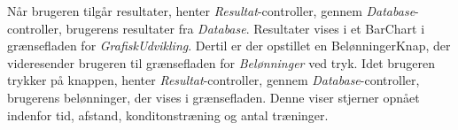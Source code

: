 \noindent 
Når brugeren tilgår resultater, henter \textit{Resultat}-controller, gennem \textit{Database}-controller, brugerens resultater fra \textit{Database}. Resultater vises i et BarChart i grænsefladen for \textit{GrafiskUdvikling}. Dertil er der opstillet en BelønningerKnap, der videresender brugeren til grænsefladen for \textit{Belønninger} ved tryk. Idet brugeren trykker på knappen, henter \textit{Resultat}-controller, gennem \textit{Database}-controller, brugerens belønninger, der vises i grænsefladen. Denne viser stjerner opnået indenfor tid, afstand, konditonstræning og antal træninger.

